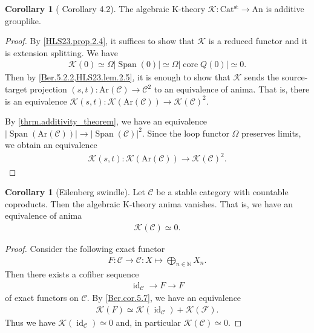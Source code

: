 \documentclass[a4paper,dvipdfmx,11pt,reqno]{amsart}
\DeclareMathOperator{\id}{id}
\newcommand{\C}{\mathcal{C}}
\newcommand{\F}{\mathcal{F}}
\newcommand{\K}{\mathcal{K}}
\DeclareMathOperator{\core}{core}
\DeclareMathOperator{\Span}{Span}
\newcommand{\An}{\mathrm{An}}
\newcommand{\Catst}{\mathrm{Cat^{st}}}
\newcommand{\Ar}{\mathrm{Ar}}
\theoremstyle{definition}
\newtheorem{corollary}[theorem]{Corollary}
\begin{document}
\begin{corollary}[\cite{HLS23} Corollary 4.2] \label{HLS23.cor.4.2}
  The algebraic K-theory $\K : \Catst \to \An$ is additive grouplike.
\end{corollary}

\begin{proof}
  By \cref{HLS23.prop.2.4}, it suffices to show that $\K$ is a reduced functor and it is extension splitting.
  We have 
  \begin{align*}
    \K(0) \simeq \Omega|\Span(0)| \simeq \Omega|\core Q(0)| \simeq 0.
  \end{align*}
  Then by \cref{Ber.5.2.2,HLS23.lem.2.5}, it is enough to show that $\K$ sends the source-target projection $(s,t) : \Ar(\C) \to \C^2$ to an equivalence of anima.
  That is, there is an equivalence $\K(s,t) : \K(\Ar(\C)) \to \K(\C)^2$.
  
  By \cref{thrm.additivity_theorem}, we have an equivalence $|\Span(\Ar(\C))| \to |\Span(\C)|^2$.
  Since the loop functor $\Omega$ preserves limits, we obtain an equivalence
  \begin{align*}
    \K(s,t) : \K(\Ar(\C)) \to \K(\C)^2.
  \end{align*}
\end{proof}

\begin{corollary}[Eilenberg swindle] \label{Ber.prop.A.4}
  Let $\C$ be a stable category with countable coproducts.
  Then the algebraic K-theory anima vanishes.
  That is, we have an equivalence of anima
  \begin{align*}
    \K(\C) \simeq 0.
  \end{align*}
\end{corollary}

\begin{proof}
  Consider the following exact functor
  \begin{align*}
    F : \C \to \C : X \mapsto \bigoplus_{n \in \mathbb{N}} X_n .
  \end{align*}
  Then there exists a cofiber sequence 
  \begin{align*}
    \id_{\C} \to F \to F
  \end{align*}
  of exact functors on $\C$.
  By \cref{Ber.cor.5.7}, we have an equivalence 
  \begin{align*}
    \K(F) 
    \simeq \K(\id_{\C}) + \K(\F). 
  \end{align*}
  Thus we have $\K(\id_{\C}) \simeq 0$ and, in particular $\K(\C) \simeq 0$.
\end{proof}
\end{document}

